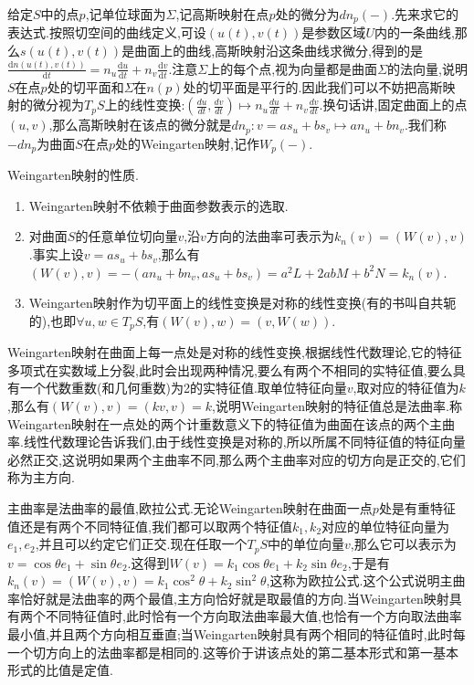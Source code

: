给定$S$中的点$p$,记单位球面为$\Sigma$,记高斯映射在点$p$处的微分为$dn_p(-)$.先来求它的表达式.按照切空间的曲线定义,可设$(u(t),v(t))$是参数区域$U$内的一条曲线,那么$s(u(t),v(t))$是曲面上的曲线,高斯映射沿这条曲线求微分,得到的是$\frac{\mathrm{d}n(u(t),v(t))}{\mathrm{d}t}=n_u\frac{\mathrm{d}u}{\mathrm{d}t}+n_v\frac{\mathrm{d}v}{\mathrm{d}t}$.注意$\Sigma$上的每个点,视为向量都是曲面$\Sigma$的法向量,说明$S$在点$p$处的切平面和$\Sigma$在$n(p)$处的切平面是平行的.因此我们可以不妨把高斯映射的微分视为$T_pS$上的线性变换:$\left(\frac{du}{dt},\frac{dv}{dt}\right)\mapsto n_u\frac{du}{dt}+n_v\frac{dv}{dt}$.换句话讲,固定曲面上的点$(u,v)$,那么高斯映射在该点的微分就是$dn_p:v=as_u+bs_v\mapsto an_u+bn_v$.我们称$-dn_p$为曲面$S$在点$p$处的Weingarten映射,记作$W_p(-)$.

Weingarten映射的性质.
\begin{enumerate}
	\item Weingarten映射不依赖于曲面参数表示的选取.
	\item 对曲面$S$的任意单位切向量$v$,沿$v$方向的法曲率可表示为$k_n(v)=(W(v),v)$.事实上设$v=as_u+bs_v$,那么有$(W(v),v)=-(an_u+bn_v,as_u+bs_v)=a^2L+2abM+b^2N=k_n(v)$.
	\item Weingarten映射作为切平面上的线性变换是对称的线性变换(有的书叫自共轭的),也即$\forall u,w\in T_pS$,有$(W(v),w)=(v,W(w))$.
\end{enumerate}

Weingarten映射在曲面上每一点处是对称的线性变换,根据线性代数理论,它的特征多项式在实数域上分裂,此时会出现两种情况,要么有两个不相同的实特征值,要么具有一个代数重数(和几何重数)为2的实特征值.取单位特征向量$v$,取对应的特征值为$k$,那么有$(W(v),v)=(kv,v)=k$,说明Weingarten映射的特征值总是法曲率.称Weingarten映射在一点处的两个计重数意义下的特征值为曲面在该点的两个主曲率.线性代数理论告诉我们,由于线性变换是对称的,所以所属不同特征值的特征向量必然正交,这说明如果两个主曲率不同,那么两个主曲率对应的切方向是正交的,它们称为主方向.

主曲率是法曲率的最值,欧拉公式.无论Weingarten映射在曲面一点$p$处是有重特征值还是有两个不同特征值,我们都可以取两个特征值$k_1,k_2$对应的单位特征向量为$e_1,e_2$,并且可以约定它们正交.现在任取一个$T_pS$中的单位向量$v$,那么它可以表示为$v=\cos\theta e_1+\sin\theta e_2$.这得到$W(v)=k_1\cos\theta e_1+k_2\sin\theta e_2$,于是有$k_n(v)=(W(v),v)=k_1\cos^2\theta+k_2\sin^2\theta$,这称为欧拉公式.这个公式说明主曲率恰好就是法曲率的两个最值,主方向恰好就是取最值的方向.当Weingarten映射具有两个不同特征值时,此时恰有一个方向取法曲率最大值,也恰有一个方向取法曲率最小值,并且两个方向相互垂直;当Weingarten映射具有两个相同的特征值时,此时每一个切方向上的法曲率都是相同的.这等价于讲该点处的第二基本形式和第一基本形式的比值是定值.

